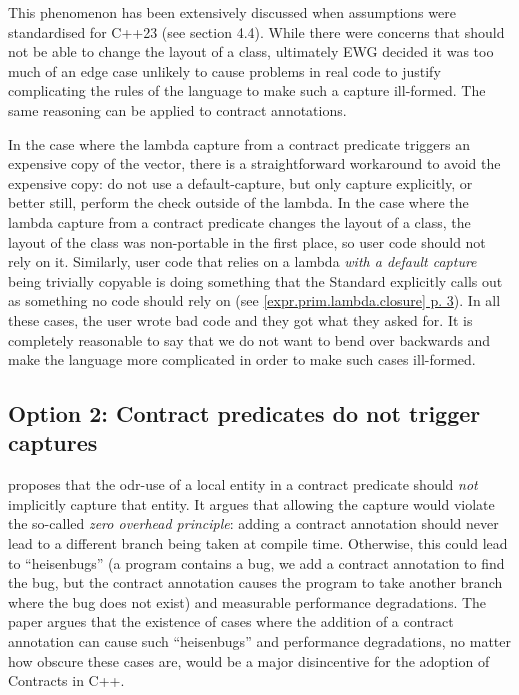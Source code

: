 This phenomenon has been extensively discussed when assumptions were standardised for C++23 (see \cite{P1774R8} section 4.4). While there were concerns that \tcode{[[assume]]} should not be able to change the layout of a class, ultimately EWG decided it was too much of an edge case unlikely to cause problems in real code to justify complicating the rules of the language to make such a capture ill-formed. The same reasoning can be applied to contract annotations.

In the case where the lambda capture from a contract predicate triggers an expensive copy of the vector, there is a straightforward workaround to avoid the expensive copy: do not use a default-capture, but only capture  explicitly, or better still, perform the check outside of the lambda. In the case where the lambda capture from a contract predicate changes the layout of a class, the layout of the class was non-portable in the first place, so user code should not rely on it. Similarly, user code that relies on a lambda \emph{with a default capture} being trivially copyable is doing something that the Standard explicitly calls out as something no code should rely on (see \href{https://eel.is/c++draft/expr.prim.lambda#closure-3}{[expr.prim.lambda.closure] p. 3}). In all these cases, the user wrote bad code and they got what they asked for. It is completely reasonable to say that we do not want to bend over backwards and make the language more complicated in order to make such cases ill-formed.

\subsection*{Option 2: Contract predicates do not trigger captures}

\cite{P2932R2} proposes that the odr-use of a local entity in a contract predicate should \emph{not} implicitly capture that entity. It argues that allowing the capture would violate the so-called \emph{zero overhead principle}: adding a contract annotation should never lead to a different branch being taken at compile time. Otherwise, this could lead to ``heisenbugs'' (a program contains a bug, we add a contract annotation to find the bug, but the contract annotation causes the program to take another branch where the bug does not exist) and measurable performance degradations. The paper argues that the existence of cases where the addition of a contract annotation can cause such ``heisenbugs'' and performance degradations, no matter how obscure these cases are, would be a major disincentive for the adoption of Contracts in C++.

